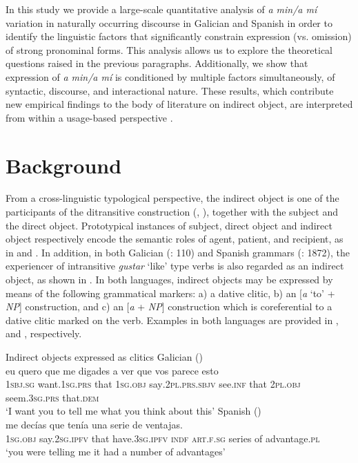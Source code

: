 \documentclass[output=paper]{langscibook}
\begin{document}
In this study we provide a large-scale quantitative analysis of \textit{a min\slash a mí} variation in naturally occurring discourse in Galician and Spanish in order to identify the linguistic factors that significantly constrain expression (vs. omission) of strong pronominal forms. This analysis allows us to explore the theoretical questions raised in the previous paragraphs. Additionally, we show that expression of \textit{a min\slash a mí} is conditioned by multiple factors simultaneously, of syntactic, discourse, and interactional nature.  These results, which contribute new empirical findings to the body of literature on indirect object, are interpreted from within a usage-based perspective \citep{Bybee2010}.

\section{Background}

From a cross-linguistic typological perspective, the indirect object is one of the participants of the ditransitive construction (\citealt[141]{Givón2001}, \citealt{Kittilä2007}), together with the subject and the direct object. Prototypical instances of subject, direct object and indirect object respectively encode the semantic roles of agent, patient, and recipient, as in  and . In addition, in both Galician (\citealt{ÁlvarezXove2002}: 110) and Spanish grammars (\citealt{GutiérrezOrdoñez1999}: 1872), the experiencer of intransitive \textit{gustar} ‘like’ type verbs is also regarded as an indirect object, as shown in . In both languages, indirect objects may be expressed by means of the following grammatical markers: a) a dative clitic, b) an [\textit{a} ‘to’ + \textit{NP}] construction, and c) an [\textit{a} + \textit{NP}] construction which is coreferential to a dative clitic marked on the verb. Examples in both languages are provided in ,  and , respectively. 

\ea%
Indirect objects expressed as clitics\label{ex:brown:1}
  \ea Galician ()\\
    \gll eu quero que me digades {a ver} que vos parece esto {\textbar}{\textbar}\\
         1\textsc{sbj.sg} want\textsc{.1sg.prs} that 1\textsc{sg.obj} say\textsc{.2pl.prs.sbjv} see\textsc{.inf} that \textsc{2pl.obj} seem\textsc{.3sg.prs} that.\textsc{dem}\\
    \glt ‘I want you to tell me what you think about this’
  \ex Spanish ()\\
    \gll me decías que tenía una serie de ventajas.\\ 
         1\textsc{sg.obj} say.\textsc{2sg}.\textsc{ipfv} that have.\textsc{3sg}.\textsc{ipfv} {\textsc{indf} \textsc{art.f.sg}} series of advantage.\textsc{pl}\\
     \glt `you were telling me it had a number of advantages'
  \z
\end{document}
